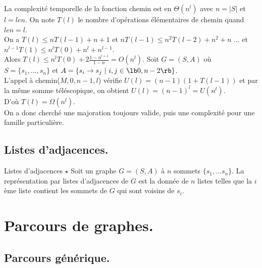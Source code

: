 \documentclass[french, 11pt]{article}
\begin{document}
\pagebreak

\begin{prop}{}{}
    La complexité temporelle de la fonction chemin est en $\Theta(n^l)$ avec $n=|S|$ et $l=len$.
    \tcblower
    On note $T(l)$ le nombre d'opérations élémentaires de chemin quand $len=l$.\\
    On a $T(l)\leq nT(l-1)+ n + 1$ et $nT(l-1)\leq n^2T(l-2)+n^2 + n$ ... et $n^{l-1}T(1)\leq n^lT(0)+n^l+n^{l-1}$.\\
    Alors $T(l)\leq n^lT(0) + 2\frac{1-n^{l+1}}{1-n}=O(n^l)$.\n
    Soit $G=(S,A)$ où $S=\{s_1,...,s_n\}$ et $A=\{s_i\to s_j ~ | ~ i,j\in\lb0,n-2\rb\}$.\\
    L'appel à chemin($M, 0, n-1, l$) vérifie $U(l)=(n-1)(1+T(l-1))$ et par la même somme téléscopique, on obtient $U(l)=(n-1)^l=U(n^l)$.\\
    D'où $T(l)=\Omega(n^l)$.\\
    On a donc cherché une majoration toujours valide, puis une complexité pour une famille particulière.
\end{prop}

\subsection{Listes d'adjacences.}

\begin{defi}{Listes d'adjacences $\star$}{}
    Soit un graphe $G=(S,A)$ à $n$ sommets $\{s_1,...s_n\}$. La représentation par listes d'adjacences de $G$ est la donnée de $n$ listes telles que la $i$ème liste contient les sommets de $G$ qui sont voisins de $s_i$.
\end{defi}

\section{Parcours de graphes.}
\subsection{Parcours générique.}
\end{document}
